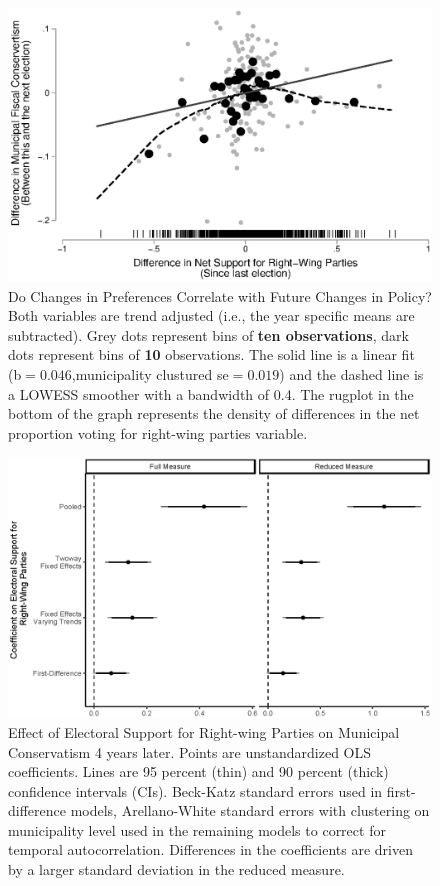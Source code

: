 \documentclass[a4paper,12pt]{article}
\begin{document}
\begin{figure}[h]
	\centering
	\includegraphics[scale = 0.8]{scatterplot.eps}
	\caption{Do Changes in Preferences Correlate with Future Changes in Policy? Both variables are trend adjusted (i.e., the year specific means are subtracted). Grey dots represent bins of \textbf{ten observations}, dark dots represent bins of \textbf{10} observations. The solid line is a linear fit (b$=0.046$,municipality clustured se$=0.019$) and the dashed line is a LOWESS smoother with a bandwidth of 0.4. The rugplot in the bottom of the graph represents the density of differences in the net proportion voting for right-wing parties variable. }
	\label{fig:scatter}
\end{figure}

\begin{figure}[htbp]
	\centering
	\includegraphics[scale = 0.7]{CoefPlot_18092018.eps}
	\caption{Effect of Electoral Support for Right-wing Parties on Municipal Conservatism 4 years later. Points are unstandardized OLS coefficients. Lines are 95 percent (thin) and 90 percent (thick) confidence intervals (CIs). Beck-Katz standard errors used in first-difference models, Arellano-White standard errors with clustering on municipality level used in the remaining models to correct for temporal autocorrelation. Differences in the coefficients are driven by a larger standard deviation in the reduced measure.}
	\label{fig:FourYearLead}
\end{figure}
\end{document}
